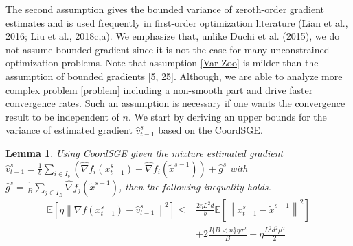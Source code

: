 \documentclass{article}
\newcommand*{\E}{\mathbb{E}}
\newcommand{\norm}[1]{\left\lVert#1\right\rVert}
\newtheorem{lemma}[theorem]{Lemma}
\theoremstyle{definition}
\theoremstyle{remark}
\begin{document}
{\color{Green} The second assumption gives the bounded variance of zeroth-order gradient estimates and is used frequently in first-order optimization literature (Lian et al., 2016; Liu et al., 2018c,a). {\color{Brown}
We emphasize that, unlike Duchi et al. (2015), we do not assume  bounded gradient since it is not the case for many unconstrained optimization problems. Note that assumption \ref{Var-Zoo} is milder than the assumption of bounded gradients [5, 25].}
{\color{Green}Although, we are able to analyze more complex problem \eqref{problem} including a non-smooth part and drive faster convergence rates.} {\color{Violet}Such an assumption is necessary if one wants the convergence result to be independent of $n$.
}
{\color{Green}
We start by deriving an upper bounds for the variance of estimated gradient $\hat{v}_{t-1}^s$ based on the CoordSGE.}
}
\begin{lemma}\label{var-estimate-lem}
Using CoordSGE given the mixture estimated gradient $\hat{v}_{t-1}^s = \frac{1}{b} \sum_{i\in I_b}\left(\hat{\nabla} f_{i}(x_{t-1}^s)-\hat{\nabla} f_{i}(\tilde{x}^{s-1})\right)+\hat{g}^s$ with $\hat{g}^s = \frac{1}{B} \sum_{j\in I_B} \hat{\nabla} f_j (\widetilde{x}^{s-1})$, then the following inequality holds. 
\begin{equation}
\begin{split}
\E\left[\eta\norm{\nabla f(x_{t-1}^s)-{\hat{v}_{t-1}^s}}^2\right] \leq&  \frac{2\eta L^2 d}{b}\E\left[\norm{x_{t-1}^s-\widetilde{x}^{s-1}}^2\right]\\
&+ 2\frac{I\{B < n\}\eta \sigma ^2}{B}+\eta \frac{L^2 d^2 \mu^2}{2}
\end{split}
\end{equation}
\end{lemma}
\end{document}
